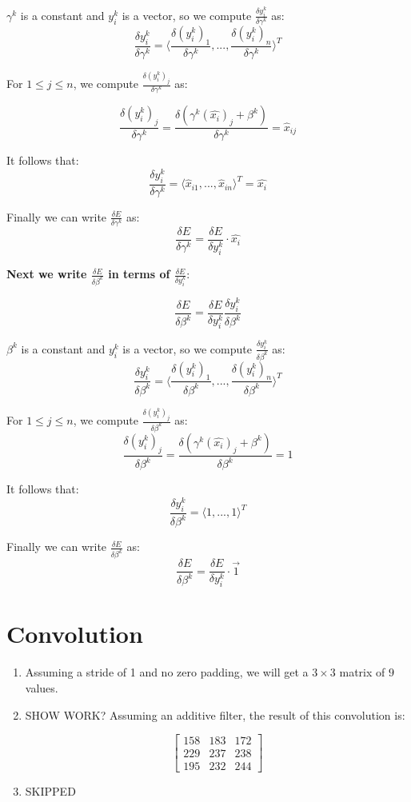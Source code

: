 \documentclass[a4paper]{article}
\begin{document}
\begin{enumerate}
{$\gamma^k$ is a constant and $y_i^k$ is a vector, so we compute $\frac{\delta y_i^k}{\delta \gamma^k}$ as:
$$ \frac{\delta y_i^k}{\delta \gamma^k} = \Big \langle \frac{\delta (y_i^k)_1}{\delta \gamma^k},...,\frac{\delta (y_i^k)_n}{\delta \gamma^k} \Big \rangle^T$$

For $1 \leq j \leq n$, we compute $\frac{\delta (y_i^k)_j}{\delta \gamma^k}$ as: 

$$\frac{\delta (y_i^k)_j}{\delta \gamma^k} =  \frac{\delta ( \gamma^k (\hat{x_i})_j + \beta^k  )} {\delta \gamma^k} = \hat{x}_{ij}$$

It follows that:
$$ \frac{\delta y_i^k}{\delta \gamma^k} = \langle \hat{x}_{i1},...,\hat{x}_{in} \rangle^T = \hat{x_i} $$

Finally we can write $\frac{\delta E}{\delta \gamma^k}$ as:
$$ \frac{\delta E}{\delta \gamma^k} = \frac{\delta E}{\delta y_i^k} \cdot  \hat{x_i}$$

\textbf{Next we write $\frac{\delta E}{\delta \beta^k}$ in terms of $\frac{\delta E}{\delta y_i^k}$}:

$$\frac{\delta E}{\delta \beta^k} = \frac{\delta E}{\delta y_i^k} \frac{\delta y_i^k}{\delta \beta^k}$$

$\beta^k$ is a constant and $y_i^k$ is a vector, so we compute $\frac{\delta y_i^k}{\delta \beta^k}$ as:
$$\frac{\delta y_i^k}{\delta \beta^k} = \Big \langle \frac{\delta (y_i^k)_1}{\delta \beta^k},...,\frac{\delta (y_i^k)_n}{\delta \beta^k} \Big \rangle^T$$

For $1 \leq j \leq n$, we compute $\frac{\delta (y_i^k)_j}{\delta \beta^k}$ as: 
$$\frac{\delta (y_i^k)_j}{\delta \beta^k} =  \frac{\delta ( \gamma^k (\hat{x_i})_j + \beta^k  )} {\delta \beta^k} = 1$$

It follows that:
$$ \frac{\delta y_i^k}{\delta \beta^k} = \langle 1, ..., 1 \rangle^T$$

Finally we can write $\frac{\delta E}{\delta \beta^k}$ as:
$$ \frac{\delta E}{\delta \beta^k} = \frac{\delta E}{\delta y_i^k} \cdot  \vec{1}$$
}


\end{enumerate}

\section{Convolution}

\begin{enumerate}
\item{Assuming a stride of 1 and no zero padding, we will get a $3 \times 3$ matrix of $9$ values.}
\item{SHOW WORK?
\newline
\newline
Assuming an additive filter, the result of this convolution is:

$$
\begin{bmatrix}
158 & 183 & 172 \\
229 & 237 & 238 \\
195 & 232 & 244 
\end{bmatrix}
$$

 }
\item{SKIPPED}
\end{enumerate}
\end{document}
